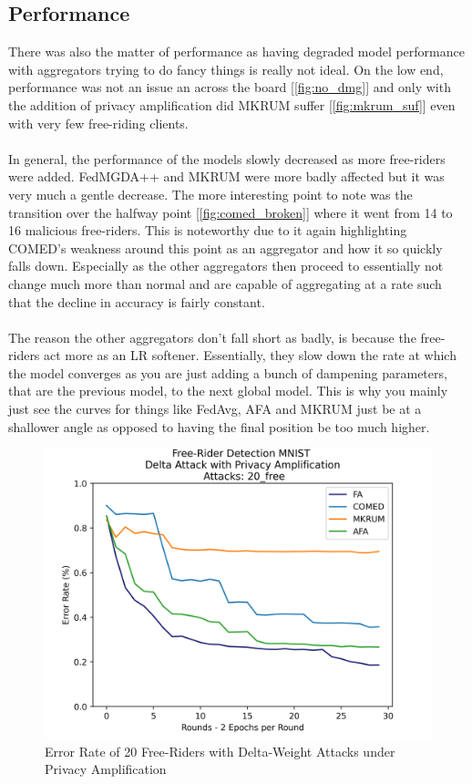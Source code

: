 \subsection{Performance}
There was also the matter of performance as having degraded model performance with aggregators trying to do fancy things is really not ideal.
On the low end, performance was not an issue an across the board [\ref{fig:no_dmg}] and only with the addition of privacy amplification did MKRUM suffer [\ref{fig:mkrum_suf}] even with very few free-riding clients.
\\ \\
In general, the performance of the models slowly decreased as more free-riders were added.
FedMGDA++ and MKRUM were more badly affected but it was very much a gentle decrease.
The more interesting point to note was the transition over the halfway point [\ref{fig:comed_broken}] where it went from 14 to 16 malicious free-riders.
This is noteworthy due to it again highlighting COMED's weakness around this point as an aggregator and how it so quickly falls down.
Especially as the other aggregators then proceed to essentially not change much more than normal and are capable of aggregating at a rate such that the decline in accuracy is fairly constant.
\\ \\
The reason the other aggregators don't fall short as badly, is because the free-riders act more as an LR softener.
Essentially, they slow down the rate at which the model converges as you are just adding a bunch of dampening parameters, that are the previous model, to the next global model.
This is why you mainly just see the curves for things like FedAvg, AFA and MKRUM just be at a shallower angle as opposed to having the final position be too much higher.
\begin{figure}[htbp]
	\centering
    \includegraphics[scale=0.5]{free_riders/graphs/priv20.png}
	\caption{Error Rate of 20 Free-Riders with Delta-Weight Attacks under Privacy Amplification}
	\label{fig:priv20}
\end{figure}

